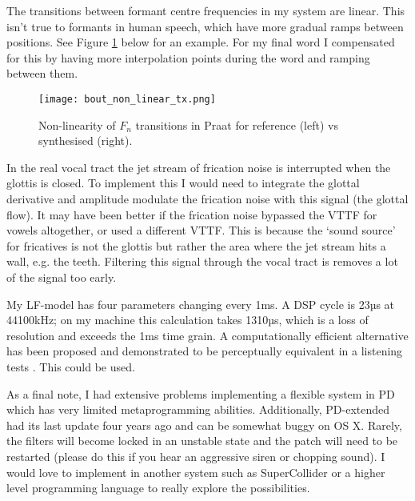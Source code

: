 The transitions between formant centre frequencies in my system are linear. This isn't true to formants in human speech, which have more gradual ramps between positions. See Figure \ref{fig:bout_non_linear_tx} below for an example. For my final word I compensated for this by having more interpolation points during the word and ramping between them. 
%
\begin{figure}[H] 
	\texttt{[image: bout\_non\_linear\_tx.png]}
	\caption{Non-linearity of $F_n$ transitions in Praat for  reference (left) vs synthesised (right).}
	\label{fig:bout_non_linear_tx}
\end{figure}
%
In the real vocal tract the jet stream of frication noise is interrupted when the glottis is closed. To implement this I would need to integrate the glottal derivative and amplitude modulate the frication noise with this signal (the glottal flow). It may have been better if the frication noise bypassed the VTTF for vowels altogether, or used a different VTTF. This is because the `sound source' for fricatives is not the glottis but rather the area where the jet stream hits a wall, e.g. the teeth. Filtering this signal through the vocal tract is removes a lot of the signal too early.

My LF-model has four parameters changing every 1ms. A DSP cycle is 23µs at 44100kHz; on my machine this calculation takes 1310µs, which is a loss of resolution and exceeds the 1ms time grain. A computationally efficient alternative has been proposed and demonstrated to be perceptually equivalent in a listening tests \cite{Veldhuis1998}. This could be used.

As a final note, I had extensive problems implementing a flexible system in PD which has very limited metaprogramming abilities. Additionally, PD-extended had its last update four years ago and can be somewhat buggy on OS X. Rarely, the  filters will become locked in an unstable state and the patch will need to be restarted (please do this if you hear an aggressive siren or chopping sound). I would love to implement in another system such as SuperCollider or a higher level programming language to really explore the possibilities.
